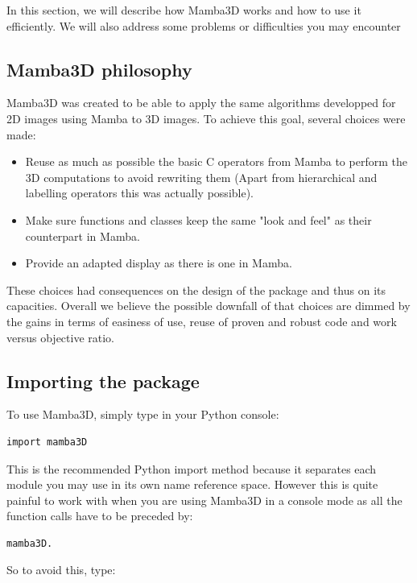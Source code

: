 \documentclass[a4paper,10pt,oneside]{article}
\begin{document}
In this section, we will describe how Mamba3D works and how to use it
efficiently. We will also address some problems or difficulties you may
encounter

\subsection{Mamba3D philosophy}

Mamba3D was created to be able to apply the same algorithms developped for
2D images using Mamba to 3D images. To achieve this goal, several choices
were made:

\begin{itemize}
\item Reuse as much as possible the basic C operators from Mamba to perform
the 3D computations to avoid rewriting them (Apart from hierarchical and
labelling operators this was actually possible).
\item Make sure functions and classes keep the same "look and feel" as their
counterpart in Mamba.
\item Provide an adapted display as there is one in Mamba.
\end{itemize}

These choices had consequences on the design of the package and thus on its
capacities. Overall we believe the possible downfall of that choices are
dimmed by the gains in terms of easiness of use, reuse of proven and robust
code and work versus objective ratio.

\subsection{Importing the package}

To use Mamba3D, simply type in your Python console:

\lstset{language=Python}
\begin{lstlisting}
import mamba3D
\end{lstlisting}

This is the recommended Python import method because it separates each module
you may use in its own name reference space. However this is quite painful
to work with when you are using Mamba3D in a console mode as all the function 
calls have to be preceded by:

\lstset{language=Python}
\begin{lstlisting}
mamba3D.
\end{lstlisting}

So to avoid this, type:
\end{document}
